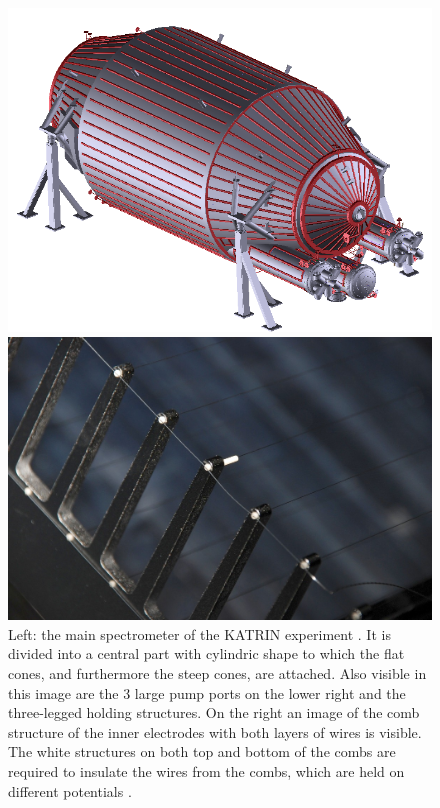       \begin{figure}
      
      	\begin{minipage}{0.67\textwidth}
      		\includegraphics[width = \textwidth]{graphics/katrinExperiment/mainSpectrometer.jpg}
      	\end{minipage}
      	\begin{minipage}{0.29\textwidth}
      		\includegraphics[angle = 90, width = \textwidth]{graphics/katrinExperiment/wireElectrodes.png}
      	\end{minipage}
      	\caption[Main Spectrometer and Wire Electrodes]{Left: the main spectrometer of the KATRIN experiment \cite{mainSpecStatus}. It is divided into a central part with cylindric shape to which the flat cones, and furthermore the steep cones, are attached. Also visible in this image are the 3 large pump ports on the lower right and the three-legged holding structures. On the right an image of the comb structure of the inner electrodes with both layers of wires is visible. The white structures on both top and bottom of the combs are required to insulate the wires from the combs, which are held on different potentials \cite{collabWireElectrodes}.}
      	\label{fig:mainSpec}
      \end{figure}
		
